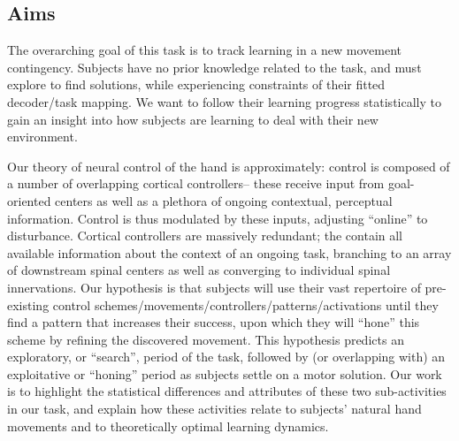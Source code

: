 \documentclass[../main.tex]{subfiles}
\begin{document}
\subsection{Aims}

The overarching goal of this task is to track learning in a new movement contingency. Subjects have no prior knowledge related to the task, and must explore to find solutions, while experiencing constraints of their fitted decoder/task mapping. We want to follow their learning progress statistically to gain an insight into how subjects are learning to deal with their new environment.

Our theory of neural control of the hand is approximately: control is composed of a number of overlapping cortical controllers– these receive input from goal-oriented centers as well as a plethora of ongoing contextual, perceptual information. Control is thus modulated by these inputs, adjusting “online” to disturbance. Cortical controllers are massively redundant; the contain all available information about the context of an ongoing task, branching to an array of downstream spinal centers as well as converging to individual spinal innervations. Our hypothesis is that subjects will use their vast repertoire of pre-existing control schemes/movements/controllers/patterns/activations until they find a pattern that increases their success, upon which they will “hone” this scheme by refining the discovered movement. This hypothesis predicts an exploratory, or “search”, period of the task, followed by (or overlapping with) an exploitative or “honing” period as subjects settle on a motor solution. Our work is to highlight the statistical differences and attributes of these two sub-activities in our task, and explain how these activities relate to subjects’ natural hand movements and to theoretically optimal learning dynamics.


\end{document}

